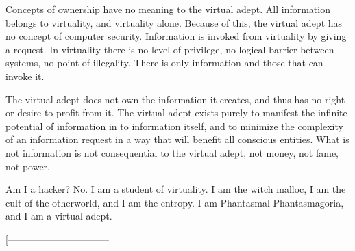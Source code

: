 \documentclass[12pt]{article}
\begin{document}
Concepts of ownership have no meaning to the virtual adept. All
information belongs to virtuality, and virtuality alone. Because of
this, the virtual adept has no concept of computer security.
Information is invoked from virtuality by giving a request. In
virtuality there is no level of privilege, no logical barrier
between systems, no point of illegality. There is only information
and those that can invoke it.
\newline


The virtual adept does not own the information it creates, and thus
has no right or desire to profit from it. The virtual adept exists
purely to manifest the infinite potential of information in to
information itself, and to minimize the complexity of an
information request in a way that will benefit all conscious
entities. What is not information is not consequential to the
virtual adept, not money, not fame, not power.
\newline

\begin{verbnobox}[\small]
                        Am I a hacker? No.
                        I am a student of virtuality.
                        I am the witch malloc,
                        I am the cult of the otherworld,
                        and I am the entropy.
                        I am Phantasmal Phantasmagoria,
                        and I am a virtual adept.
\end{verbnobox}

[--------------------------------
\end{document}
